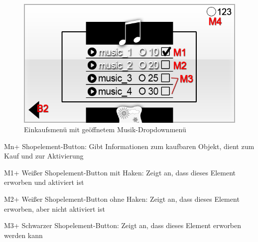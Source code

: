 \begin{figure}[H]
\centering
\includegraphics[scale=0.55]{../gui/_jpeg_numeration/shop_popup.jpg}
\caption{Einkaufsmenü mit geöffnetem Musik-Dropdownmenü}
\label{fig:Einkaufsmenu_Dropdown}
\end{figure}
\begin{description*}
\item[Mn+] Shopelement-Button: Gibt Informationen zum kaufbaren Objekt, dient zum Kauf und zur Aktivierung
\item[M1+] Weißer Shopelement-Button mit Haken: Zeigt an, dass dieses Element erworben und aktiviert ist
\item[M2+] Weißer Shopelement-Button ohne Haken: Zeigt an, dass dieses Element erworben, aber nicht aktiviert ist
\item[M3+] Schwarzer Shopelement-Button: Zeigt an, dass dieses Element erworben werden kann
\end{description*}
